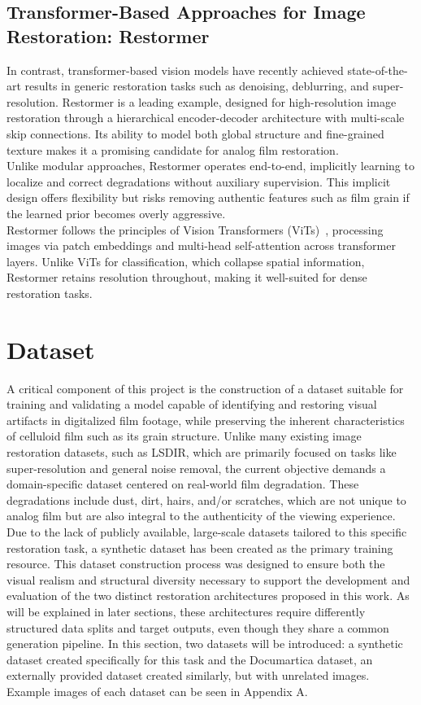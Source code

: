 \documentclass[10pt,a4paper,twocolumn,twoside]{article}
\begin{document}
\subsection{Transformer-Based Approaches for Image Restoration: Restormer}
In contrast, transformer-based vision models have recently achieved state-of-the-art results in generic restoration tasks such as denoising, deblurring, and super-resolution. Restormer is a leading example, designed for high-resolution image restoration through a hierarchical encoder-decoder architecture with multi-scale skip connections. Its ability to model both global structure and fine-grained texture makes it a promising candidate for analog film restoration. \\
Unlike modular approaches, Restormer operates end-to-end, implicitly learning to localize and correct degradations without auxiliary supervision. This implicit design offers flexibility but risks removing authentic features such as film grain if the learned prior becomes overly aggressive. \\
Restormer follows the principles of Vision Transformers (ViTs)~\cite{dosovitskiy2020image}, processing images via patch embeddings and multi-head self-attention across transformer layers. Unlike ViTs for classification, which collapse spatial information, Restormer retains resolution throughout, making it well-suited for dense restoration tasks.
\section{Dataset}
\label{sec:dataset}
A critical component of this project is the construction of a dataset suitable for training and validating a model capable of identifying and restoring visual artifacts in digitalized film footage, while preserving the inherent characteristics of celluloid film such as its grain structure. Unlike many existing image restoration datasets, such as LSDIR, which are primarily focused on tasks like super-resolution and general noise removal, the current objective demands a domain-specific dataset centered on real-world film degradation. These degradations include dust, dirt, hairs, and/or scratches, which are not unique to analog film but are also integral to the authenticity of the viewing experience. \\
Due to the lack of publicly available, large-scale datasets tailored to this specific restoration task, a synthetic dataset has been created as the primary training resource. This dataset construction process was designed to ensure both the visual realism and structural diversity necessary to support the development and evaluation of the two distinct restoration architectures proposed in this work. As will be explained in later sections, these architectures require differently structured data splits and target outputs, even though they share a common generation pipeline. In this section, two datasets will be introduced: a synthetic dataset created specifically for this task and the Documartica dataset, an externally provided dataset created similarly, but with unrelated images. Example images of each dataset can be seen in Appendix A.
\vspace*{-0.5em}
\end{document}
